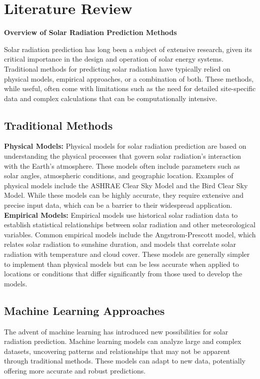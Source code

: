 \documentclass[12pt,a4paper]{report}
\begin{document}
\chapter{Literature Review}

\textbf{Overview of Solar Radiation Prediction Methods}

Solar radiation prediction has long been a subject of extensive research, given its critical importance in the design and operation of solar energy systems. Traditional methods for predicting solar radiation have typically relied on physical models, empirical approaches, or a combination of both. These methods, while useful, often come with limitations such as the need for detailed site-specific data and complex calculations that can be computationally intensive. 

\section{Traditional Methods}

\textbf{Physical Models:}
Physical models for solar radiation prediction are based on understanding the physical processes that govern solar radiation's interaction with the Earth's atmosphere. These models often include parameters such as solar angles, atmospheric conditions, and geographic location. Examples of physical models include the ASHRAE Clear Sky Model and the Bird Clear Sky Model. While these models can be highly accurate, they require extensive and precise input data, which can be a barrier to their widespread application.\\
\textbf{Empirical Models:}
Empirical models use historical solar radiation data to establish statistical relationships between solar radiation and other meteorological variables. Common empirical models include the Angstrom-Prescott model, which relates solar radiation to sunshine duration, and models that correlate solar radiation with temperature and cloud cover. These models are generally simpler to implement than physical models but can be less accurate when applied to locations or conditions that differ significantly from those used to develop the models.

\section{Machine Learning Approaches}

The advent of machine learning has introduced new possibilities for solar radiation prediction. Machine learning models can analyze large and complex datasets, uncovering patterns and relationships that may not be apparent through traditional methods. These models can adapt to new data, potentially offering more accurate and robust predictions.
\end{document}
